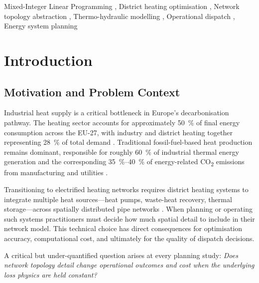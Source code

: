 \documentclass[a4paper,fleqn]{cas-sc}
\begin{document}
\begin{keywords}
Mixed-Integer Linear Programming \sep
District heating optimisation \sep
Network topology abstraction \sep
Thermo-hydraulic modelling \sep
Operational dispatch \sep
Energy system planning
\end{keywords}

\maketitle

\section{Introduction}
\label{sec:intro}

\subsection{Motivation and Problem Context}

Industrial heat supply is a critical bottleneck in Europe's
decarbonisation pathway.  The heating sector accounts for approximately
\SI{50}{\percent} of final energy consumption across the EU-27, with
industry and district heating together representing \SI{28}{\percent} of
total demand \cite{EC2021,IEA2022}.  Traditional fossil-fuel-based heat
production remains dominant, responsible for roughly \SI{60}{\percent} of
industrial thermal energy generation and the corresponding
\SIrange{35}{40}{\percent} of energy-related CO\textsubscript{2} emissions
from manufacturing and utilities \cite{EEA2023}.

Transitioning to electrified heating networks requires district heating
systems to integrate multiple heat sources---heat pumps, waste-heat
recovery, thermal storage---across spatially distributed pipe networks
\cite{Werner2017,Paardekooper2018}.  When planning or operating such systems
practitioners must decide how much spatial detail to include in their
network model.  This technical choice has direct consequences for
optimisation accuracy, computational cost, and ultimately for the quality
of dispatch decisions.

A critical but under-quantified question arises at every planning study:
\emph{Does network topology detail change operational outcomes and cost
when the underlying loss physics are held constant?}
\end{document}
